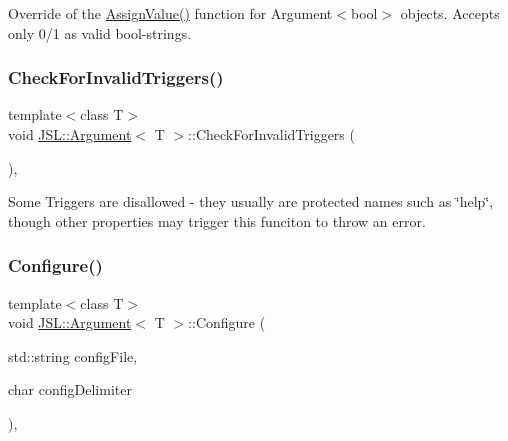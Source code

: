 Override of the \hyperlink{classJSL_1_1Argument_ac77530598054943c996dbb5fb677b844}{Assign\+Value()} function for Argument$<$bool$>$ objects. Accepts only 0/1 as valid bool-\/strings. 

\mbox{\label{classJSL_1_1Argument_a8614eb66f807132c4323847e05e666c4}} 
\subsubsection{\texorpdfstring{Check\+For\+Invalid\+Triggers()}{CheckForInvalidTriggers()}}
{\footnotesize\ttfamily template$<$class T$>$ \\
void \hyperlink{classJSL_1_1Argument}{J\+S\+L\+::\+Argument}$<$ T $>$\+::Check\+For\+Invalid\+Triggers (\begin{DoxyParamCaption}{ }\end{DoxyParamCaption})\hspace{0.3cm}{\ttfamily [inline]}, {\ttfamily [private]}}



Some Triggers are disallowed -\/ they usually are protected names such as \char`\"{}help\char`\"{}, though other properties may trigger this funciton to throw an error. 

\mbox{\label{classJSL_1_1Argument_aa626ff37dbebaf0501614dc625a76383}} 
\subsubsection{\texorpdfstring{Configure()}{Configure()}}
{\footnotesize\ttfamily template$<$class T$>$ \\
void \hyperlink{classJSL_1_1Argument}{J\+S\+L\+::\+Argument}$<$ T $>$\+::Configure (\begin{DoxyParamCaption}\item[{std\+::string}]{config\+File,  }\item[{char}]{config\+Delimiter }\end{DoxyParamCaption})\hspace{0.3cm}{\ttfamily [inline]}, {\ttfamily [virtual]}}



